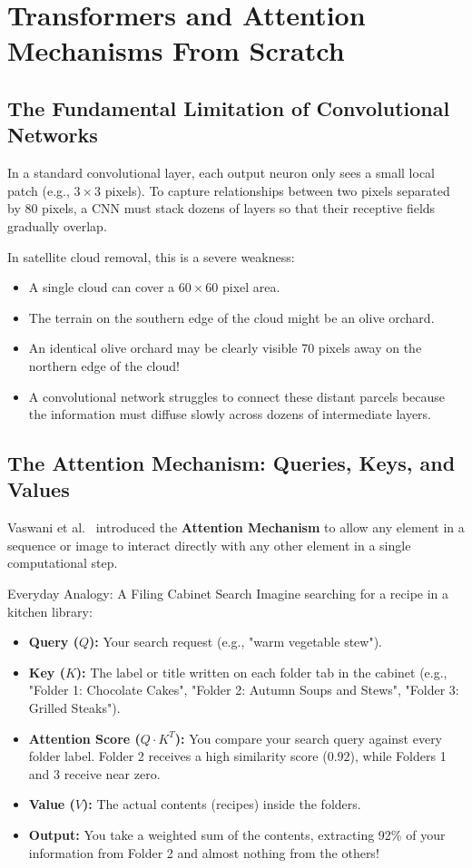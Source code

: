 \chapter{Transformers and Attention Mechanisms From Scratch}
\label{chap:ch10}

\section{The Fundamental Limitation of Convolutional Networks}
In a standard convolutional layer, each output neuron only sees a small local patch (e.g., $3 \times 3$ pixels). To capture relationships between two pixels separated by 80 pixels, a CNN must stack dozens of layers so that their receptive fields gradually overlap.

In satellite cloud removal, this is a severe weakness:
\begin{itemize}
    \item A single cloud can cover a $60 \times 60$ pixel area.
    \item The terrain on the southern edge of the cloud might be an olive orchard.
    \item An identical olive orchard may be clearly visible 70 pixels away on the northern edge of the cloud!
    \item A convolutional network struggles to connect these distant parcels because the information must diffuse slowly across dozens of intermediate layers.
\end{itemize}

\section{The Attention Mechanism: Queries, Keys, and Values}
Vaswani et al.~\cite{vaswani2017attention} introduced the \textbf{Attention Mechanism} to allow any element in a sequence or image to interact directly with any other element in a single computational step.

\begin{conceptbox}{Everyday Analogy: A Filing Cabinet Search}
Imagine searching for a recipe in a kitchen library:
\begin{itemize}
    \item \textbf{Query ($Q$):} Your search request (e.g., "warm vegetable stew").
    \item \textbf{Key ($K$):} The label or title written on each folder tab in the cabinet (e.g., "Folder 1: Chocolate Cakes", "Folder 2: Autumn Soups and Stews", "Folder 3: Grilled Steaks").
    \item \textbf{Attention Score ($Q \cdot K^T$):} You compare your search query against every folder label. Folder 2 receives a high similarity score ($0.92$), while Folders 1 and 3 receive near zero.
    \item \textbf{Value ($V$):} The actual contents (recipes) inside the folders.
    \item \textbf{Output:} You take a weighted sum of the contents, extracting 92\% of your information from Folder 2 and almost nothing from the others!
\end{itemize}
\end{conceptbox}

